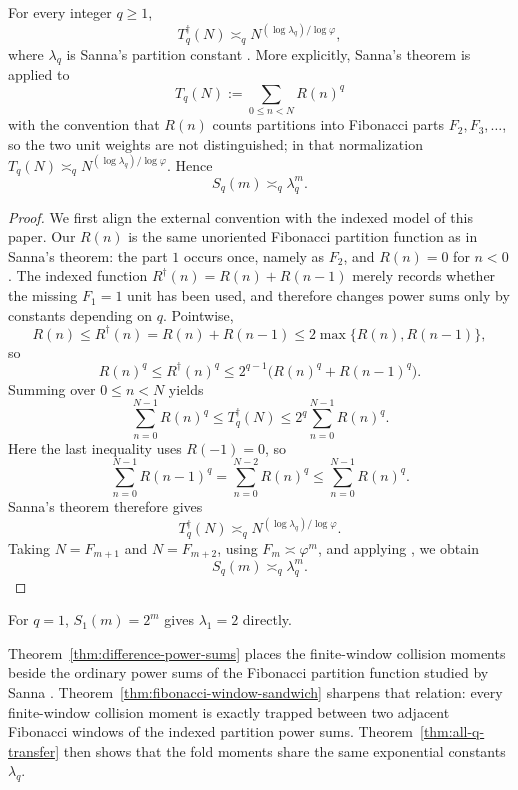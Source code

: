 \begin{theorem}
\label{thm:all-q-transfer}
For every integer \(q\ge 1\),
\[
  T_q^\dagger(N)\asymp_q N^{(\log \lambda_q)/\log\varphi},
\]
where \(\lambda_q\) is Sanna's partition constant \cite[Thm.~1.1]{Sanna2025}.
More explicitly, Sanna's theorem is applied to
\[
  T_q(N):=\sum_{0\le n<N}R(n)^q
\]
with the convention that \(R(n)\) counts partitions into Fibonacci parts
\(F_2,F_3,\dots\), so the two unit weights are not distinguished; in that
normalization \(T_q(N)\asymp_q
N^{(\log\lambda_q)/\log\varphi}\).  Hence
\[
  S_q(m)\asymp_q \lambda_q^m.
\]
\end{theorem}

\begin{proof}
We first align the external convention with the indexed model of this paper.
Our \(R(n)\) is the same unoriented Fibonacci partition function as in
Sanna's theorem: the part \(1\) occurs once, namely as \(F_2\), and
\(R(n)=0\) for \(n<0\).  The indexed function
\(R^\dagger(n)=R(n)+R(n-1)\) merely records whether the missing \(F_1=1\) unit
has been used, and therefore changes power sums only by constants depending on
\(q\).
Pointwise,
\[
  R(n)\le R^\dagger(n)=R(n)+R(n-1)\le 2\max\{R(n),R(n-1)\},
\]
so
\[
  R(n)^q\le R^\dagger(n)^q
  \le 2^{q-1}\bigl(R(n)^q+R(n-1)^q\bigr).
\]
Summing over \(0\le n<N\) yields
\[
  \sum_{n=0}^{N-1} R(n)^q
  \le
  T_q^\dagger(N)
  \le
  2^q\sum_{n=0}^{N-1} R(n)^q.
\]
Here the last inequality uses \(R(-1)=0\), so
\[
  \sum_{n=0}^{N-1}R(n-1)^q
  =
  \sum_{n=0}^{N-2}R(n)^q
  \le
  \sum_{n=0}^{N-1}R(n)^q.
\]
Sanna's theorem \cite[Thm.~1.1]{Sanna2025} therefore gives
\[
  T_q^\dagger(N)\asymp_q N^{(\log \lambda_q)/\log\varphi}.
\]
Taking \(N=F_{m+1}\) and \(N=F_{m+2}\), using \(F_m\asymp\varphi^m\), and
applying , we obtain
\[
  S_q(m)\asymp_q \lambda_q^m.
\]
\end{proof}

\begin{remark}[The case \texorpdfstring{$q=1$}{q=1}]
\label{rem:lambda-one}
For \(q=1\), \(S_1(m)=2^m\) gives \(\lambda_1=2\) directly.
\end{remark}

\begin{remark}
\label{rem:sanna-relation}
Theorem~\ref{thm:difference-power-sums} places the finite-window collision
moments beside the ordinary power sums of the Fibonacci partition function
studied by Sanna \cite{Sanna2025}.  Theorem~\ref{thm:fibonacci-window-sandwich}
sharpens that relation: every finite-window collision moment is exactly trapped
between two adjacent Fibonacci windows of the indexed partition power sums.
Theorem~\ref{thm:all-q-transfer} then shows that the fold moments share the
same exponential constants \(\lambda_q\).
\end{remark}

